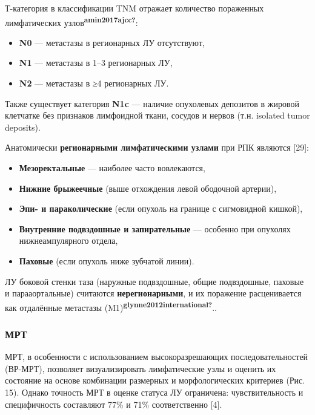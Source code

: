 \documentclass[
  russian,
  12pt,
  a4paper,
]{report}
\begin{document}
Т-категория в классификации TNM отражает количество пораженных
лимфатических узлов\textsuperscript{\textbf{amin2017ajcc?}}:

\begin{itemize}
\item
  \textbf{N0} --- метастазы в регионарных ЛУ отсутствуют,
\item
  \textbf{N1} --- метастазы в 1--3 регионарных ЛУ,
\item
  \textbf{N2} --- метастазы в ≥4 регионарных ЛУ.
\end{itemize}

Также существует категория \textbf{N1c} --- наличие опухолевых депозитов
в жировой клетчатке без признаков лимфоидной ткани, сосудов и нервов
(т.н. isolated tumor deposits).

Анатомически \textbf{регионарными лимфатическими узлами} при РПК
являются {[}29{]}:

\begin{itemize}
\item
  \textbf{Мезоректальные} --- наиболее часто вовлекаются,
\item
  \textbf{Нижние брыжеечные} (выше отхождения левой ободочной артерии),
\item
  \textbf{Эпи- и параколические} (если опухоль на границе с сигмовидной
  кишкой),
\item
  \textbf{Внутренние подвздошные и запирательные} --- особенно при
  опухолях нижнеампулярного отдела,
\item
  \textbf{Паховые} (если опухоль ниже зубчатой линии).
\end{itemize}

ЛУ боковой стенки таза (наружные подвздошные, общие подвздошные, паховые
и парааортальные) считаются \textbf{нерегионарными}, и их поражение
расценивается как отдалённые метастазы
(M1)\textsuperscript{\textbf{glynne2012international?}}..

\subsubsection{МРТ}\label{ux43cux440ux442-2}

МРТ, в особенности с использованием высокоразрешающих
последовательностей (ВР-МРТ), позволяет визуализировать лимфатические
узлы и оценить их состояние на основе комбинации размерных и
морфологических критериев (Рис. 15). Однако точность МРТ в оценке
статуса ЛУ ограничена: чувствительность и специфичность составляют 77\%
и 71\% соответственно {[}4{]}.
\end{document}
